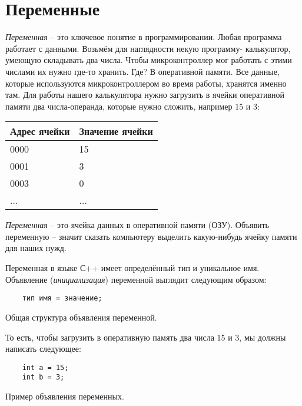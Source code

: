 \documentclass[../sparc.tex]{subfiles}
\begin{document}
\section{Переменные}

\emph{Переменная} -- это ключевое понятие в программировании. Любая программа
работает с данными. Возьмём для наглядности некую программу- калькулятор,
умеющую складывать два числа. Чтобы микроконтроллер мог работать с этими числами
их нужно где-то хранить. Где? В оперативной памяти. Все данные, которые
используются микроконтроллером во время работы, хранятся именно там. Для работы
нашего калькулятора нужно загрузить в ячейки оперативной памяти два
числа-операнда, которые нужно сложить, например 15 и 3:

\begin{tabular}{p{4cm}|p{6cm}}
  Адрес ячейки & Значение ячейки \\
  \hline \hline
  0000 & 15 \\
  \hline
  0001 & 3 \\
  \hline
  0003 & 0 \\
  ... & ... \\
\end{tabular}

\emph{Переменная} -- это ячейка данных в оперативной памяти (ОЗУ). Объявить
переменную -- значит сказать компьютеру выделить какую-нибудь ячейку памяти для
наших нужд.

Переменная в языке С++ имеет определённый тип и уникальное имя. Объявление
(\emph{инициализация}) переменной выглядит следующим образом:

\begin{listing}[ht]
  \begin{verbatim}
    тип имя = значение;
  \end{verbatim}
  \label{listing:dialogues-with-computer-variable-definition-structure}
  \caption{Общая структура объявления переменной.}
\end{listing}

То есть, чтобы загрузить в оперативную память два числа 15 и 3, мы должны написать
следующее:

\begin{listing}[ht]
  \begin{verbatim}
    int a = 15;
    int b = 3;
  \end{verbatim}
  \label{listing:dialogues-with-computer-variable-definition-example}
  \caption{Пример объявления переменных.}
\end{listing}
\end{document}
